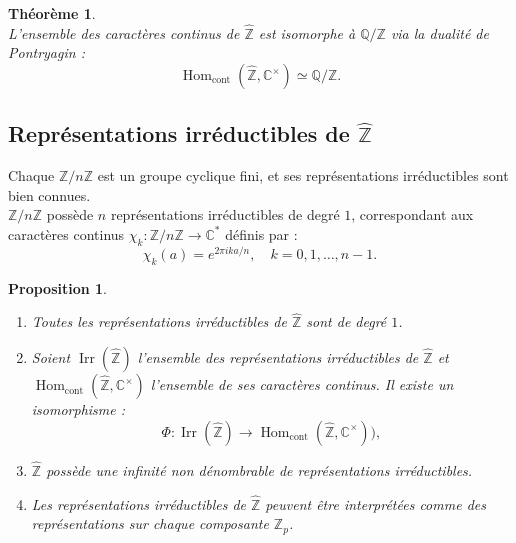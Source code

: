 \documentclass[a4paper, 14pt]{report}
\newtheorem{proposition}{Proposition}[section]
\newtheorem{theorem}{Théorème}[section]
\begin{document}
\begin{onehalfspace}
{\begin{theorem} \cite{ribes-zalesskii}\\
L'ensemble des caractères continus de $\widehat{\mathbb{Z}}$ est isomorphe à $\mathbb{Q}/\mathbb{Z}$ via la dualité de Pontryagin :
	\[
	\operatorname{Hom}_{\text{cont}}(\widehat{\mathbb{Z}}, \mathbb{C}^\times) \simeq \mathbb{Q}/\mathbb{Z}.
	\]
\end{theorem}


\subsection{Représentations irréductibles de $\widehat{\mathbb{Z}}$}
Chaque $\mathbb{Z}/n\mathbb{Z}$ est un groupe cyclique fini, et ses représentations irréductibles sont bien connues.\\
$\mathbb{Z}/n\mathbb{Z}$ possède $n$ représentations irréductibles de degré $1$, correspondant aux caractères continus $\chi_k : \mathbb{Z}/n\mathbb{Z} \to \mathbb{C}^*$ définis par :
\[
\chi_k(a) = e^{2\pi i k a / n}, \quad k = 0, 1, \dots, n-1.
\]


\begin{proposition}
\begin{enumerate} [label=\roman*)] \
	\item Toutes les représentations irréductibles de $\widehat{\mathbb{Z}}$ sont de degré $1$.
	\item Soient $\operatorname{Irr}(\widehat{\mathbb{Z}})$ l'ensemble des représentations irréductibles de $\widehat{\mathbb{Z}}$ et $\operatorname{Hom}_{\text{cont}}(\widehat{\mathbb{Z}}, \mathbb{C}^\times)$ l'ensemble de ses caractères continus. Il existe un isomorphisme :
	\[
	\Phi : \operatorname{Irr}(\widehat{\mathbb{Z}}) \to \operatorname{Hom}_{\text{cont}}(\widehat{\mathbb{Z}}, \mathbb{C}^\times)),
	\]
	\item $\widehat{\mathbb{Z}}$ possède une infinité non dénombrable de représentations irréductibles.
	\item Les représentations irréductibles de $\widehat{\mathbb{Z}}$ peuvent être interprétées comme des représentations sur chaque composante $\mathbb{Z}_p$.
\end{enumerate}
\end{proposition}


}
\end{onehalfspace}
\end{document}
